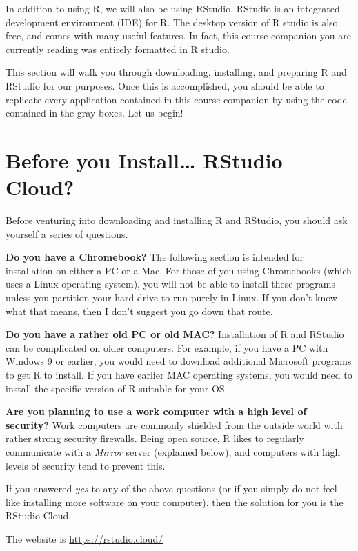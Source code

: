 \documentclass[
]{book}
\begin{document}
In addition to using R, we will also be using RStudio. RStudio is an integrated development environment (IDE) for R. The desktop version of R studio is also free, and comes with many useful features. In fact, this course companion you are currently reading was entirely formatted in R studio.

This section will walk you through downloading, installing, and preparing R and RStudio for our purposes. Once this is accomplished, you should be able to replicate every application contained in this course companion by using the code contained in the gray boxes. Let us begin!

\hypertarget{before-you-install-rstudio-cloud}{%
\section{Before you Install\ldots{} RStudio Cloud?}\label{before-you-install-rstudio-cloud}}

Before venturing into downloading and installing R and RStudio, you should ask yourself a series of questions.

\textbf{Do you have a Chromebook?}
The following section is intended for installation on either a PC or a Mac. For those of you using Chromebooks (which uses a Linux operating system), you will not be able to install these programs unless you partition your hard drive to run purely in Linux. If you don't know what that means, then I don't suggest you go down that route.

\textbf{Do you have a rather old PC or old MAC?}
Installation of R and RStudio can be complicated on older computers. For example, if you have a PC with Windows 9 or earlier, you would need to download additional Microsoft programs to get R to install. If you have earlier MAC operating systems, you would need to install the specific version of R suitable for your OS.

\textbf{Are you planning to use a work computer with a high level of security?}
Work computers are commonly shielded from the outside world with rather strong security firewalls. Being open source, R likes to regularly communicate with a \emph{Mirror} server (explained below), and computers with high levels of security tend to prevent this.

If you answered \emph{yes} to any of the above questions (or if you simply do not feel like installing more software on your computer), then the solution for you is the RStudio Cloud.

The website is \url{https://rstudio.cloud/}
\end{document}
